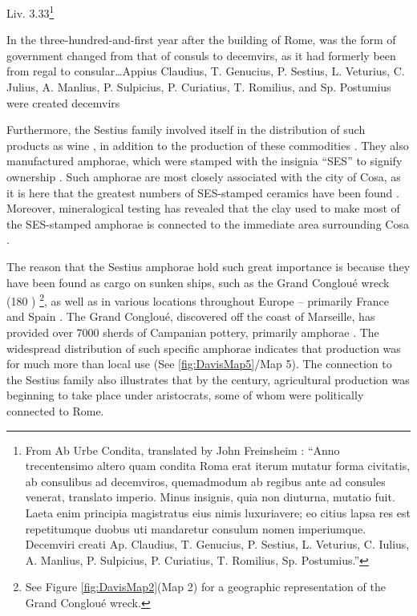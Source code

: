 \begin{aquote}{Liv. 3.33\footnote{From Ab Urbe Condita, translated by John Freinsheim \textcite{Livy_1744}: “Anno trecentensimo altero quam condita Roma erat iterum mutatur forma civitatis, ab consulibus ad decemviros, quemadmodum ab regibus ante ad consules venerat, translato imperio. Minus insignis, quia non diuturna, mutatio fuit. Laeta enim principia magistratus eius nimis luxuriavere; eo citius lapsa res est repetitumque duobus uti mandaretur consulum nomen imperiumque. Decemviri creati Ap. Claudius, T. Genucius, P. Sestius, L. Veturius, C. Iulius, A. Manlius, P. Sulpicius, P. Curiatius, T. Romilius, Sp. Postumius.”}}
	
In the three-hundred-and-first year after the building of Rome, was the form of government changed from that of consuls to decemvirs, as it had formerly been from regal to consular…Appius Claudius, T. Genucius, P. Sestius, L. Veturius, C. Julius, A. Manlius, P. Sulpicius, P. Curiatius, T. Romilius, and Sp. Postumius were created decemvirs
\end{aquote}
Furthermore, the Sestius family involved itself in the distribution of such products as wine \parencites[16]{Purcell_1985}[119]{Storey_2004}, in addition to the production of these commodities \parencite[293]{Wilson_2012}. They also manufactured amphorae, which were stamped with the insignia “SES” to signify ownership \parencite[342--344]{Will_1979}. Such amphorae are most closely associated with the city of Cosa, as it is here that the greatest numbers of SES-stamped ceramics have been found \parencite[129]{Manacorda_1978}. Moreover, mineralogical testing has revealed that the clay used to make most of the SES-stamped amphorae is connected to the immediate area surrounding Cosa \parencite[345]{Will_1979}. 

The reason that the Sestius amphorae hold such great importance is because they have been found as cargo on sunken ships, such as the Grand Congloué wreck (180 \BC)
\footnote{See Figure \ref{fig:DavisMap2}(Map 2) for a geographic representation of the Grand Congloué wreck.}, as well as in various locations throughout Europe – primarily France and Spain \parencite[125--127]{Manacorda_1978}. The Grand Congloué, discovered off the coast of Marseille, has provided over \num{7000} sherds of Campanian pottery, primarily amphorae \parencite{Strauss_2013}. The widespread distribution of such specific amphorae indicates that production was for much more than local use (See \ref{fig:DavisMap5}/Map 5). The connection to the Sestius family also illustrates that by the  century\BC, agricultural production was beginning to take place under aristocrats, some of whom were politically connected to Rome.

